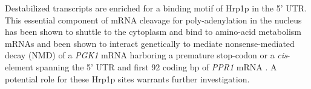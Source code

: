 Destabilized
transcripts are enriched for a binding motif of Hrp1p in
the 5' UTR. This essential component of mRNA cleavage for
poly-adenylation in the nucleus has been shown to shuttle to the
cytoplasm and bind to amino-acid metabolism mRNAs
\parencite{guisbert2005functional} and been shown to interact genetically to
mediate nonsense-mediated decay (NMD) of a \textit{PGK1} mRNA harboring a
premature stop-codon \parencite{gonzalez2000yeast} or a \textit{cis}-element spanning
the 5' UTR and first 92 coding bp of \textit{PPR1} mRNA
\parencite{kebaara2003upf}.
A potential role for these Hrp1p sites warrants further investigation. 

